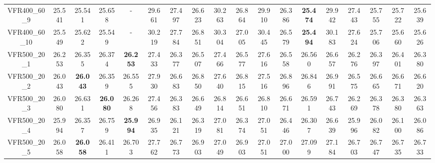 \begin{tabular}{cc|ccc|ccccccccccccc}
VFR400\_60\_9      & 25.541           & 25.541           & 25.658           & -                & 29.661           & 27.497           & 26.623           & 30.263           & 26.864           & 29.910           & 26.386           & {\bf 25.474}     & 29.942           & 27.443           & 25.755           & 25.722           & 25.639          \\ 
VFR400\_60\_10     & 25.549           & 25.622           & 25.549           & -                & 30.219           & 27.784           & 26.851           & 30.304           & 27.005           & 30.445           & 26.579           & {\bf 25.494}     & 30.183           & 27.624           & 25.706           & 25.660           & 25.626          \\ 
VFR500\_20\_1      & 26.253           & 26.355           & 26.374           & {\bf 26.253}     & 27.433           & 26.377           & 26.507           & 27.466           & 26.577           & 27.616           & 26.558           & 26.560           & 26.657           & 26.276           & 26.397           & 26.401           & 26.380          \\ 
VFR500\_20\_2      & 26.043           & {\bf 26.043}     & 26.359           & 26.555           & 27.930           & 26.683           & 26.850           & 27.640           & 26.815           & 27.516           & 26.896           & 26.846           & 26.991           & 26.575           & 26.665           & 26.671           & 26.620          \\ 
VFR500\_20\_3      & 26.080           & 26.631           & {\bf 26.080}     & 26.268           & 27.456           & 26.383           & 26.649           & 26.814           & 26.651           & 26.810           & 26.671           & 26.591           & 26.743           & 26.269           & 26.378           & 26.380           & 26.363          \\ 
VFR500\_20\_4      & 25.994           & 26.357           & 26.759           & {\bf 25.994}     & 26.935           & 26.121           & 26.319           & 27.081           & 26.374           & 27.051           & 26.446           & 26.307           & 26.639           & 25.996           & 26.082           & 26.100           & 26.086          \\ 
VFR500\_20\_5      & 26.058           & {\bf 26.058}     & 26.411           & 26.703           & 27.762           & 26.773           & 26.903           & 27.049           & 26.903           & 27.051           & 27.000           & 27.099           & 27.184           & 26.703           & 26.747           & 26.735           & 26.733          \\ 

\end{tabular}
